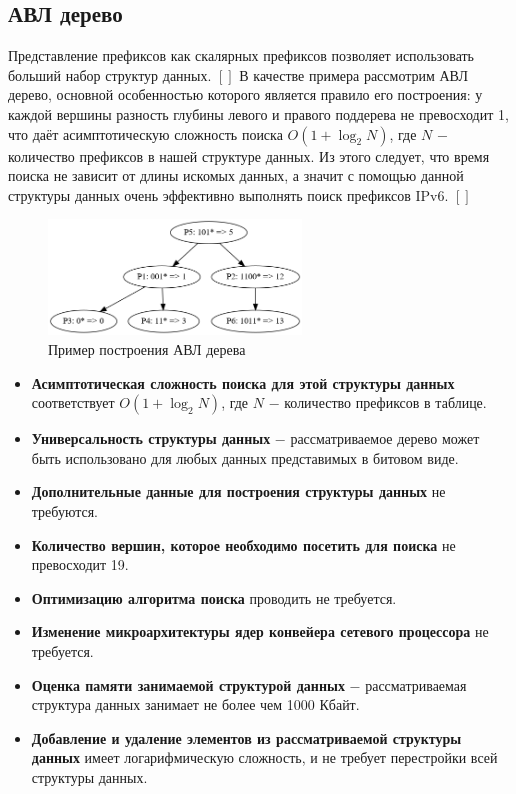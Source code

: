 \documentclass[a4peper, 12pt, titlepage, finall]{report}
\begin{document}
        \subsection{АВЛ дерево}
            Представление префиксов как скалярных префиксов позволяет использовать больший набор структур данных. $[ ]$ 
            В качестве примера рассмотрим АВЛ дерево, основной особенностью которого является правило его построения: у каждой вершины разность 
            глубины левого и правого поддерева не превосходит 1, что даёт асимптотическую сложность поиска {\ttfamily $O(1+\log_2{N})$}, 
            где {\ttfamily $N$} $-$ количество префиксов в нашей структуре данных. Из этого следует, что время поиска не зависит от длины искомых данных,
            а значит с помощью данной структуры данных очень эффективно выполнять поиск префиксов IPv6. $[ ]$
            \\
            \begin{figure}[ht]
                \centering
                \includegraphics[width=0.6\textwidth]{avl_tree.png}
                \caption{Пример построения АВЛ дерева}\label{fig:mesh5}
            \end{figure}
            \begin{itemize}
                \item\textbf{Асимптотическая сложность поиска для этой структуры данных} соответствует {\ttfamily $O(1 + \log_2{N})$},
                где {\ttfamily $N$} $-$ количество префиксов в таблице.
                \item\textbf{Универсальность структуры данных} $-$ рассматриваемое дерево может быть использовано для любых данных представимых в битовом виде.
                \item\textbf{Дополнительные данные для построения структуры данных} не требуются.
                \item\textbf{Количество вершин, которое необходимо посетить для поиска} не превосходит 19.
                \item\textbf{Оптимизацию алгоритма поиска} проводить не требуется.
                \item\textbf{Изменение микроархитектуры ядер конвейера сетевого процессора} не требуется.
                \item\textbf{Оценка памяти занимаемой структурой данных} $-$ рассматриваемая структура данных занимает не более чем 1000 Кбайт.
                \item\textbf{Добавление и удаление элементов из рассматриваемой структуры данных} имеет логарифмическую сложность, и не требует перестройки всей структуры данных.
            \end{itemize}
\end{document}
